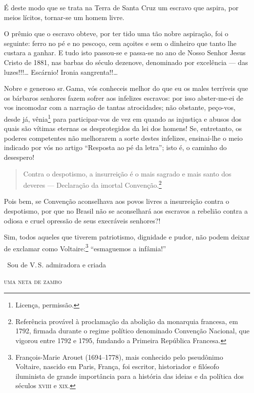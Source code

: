 É deste modo que se trata na Terra de Santa Cruz um escravo que aspira,
por meios lícitos, tornar-se um homem livre.

O prêmio que o escravo obteve, por ter tido uma tão nobre aspiração, foi
o seguinte: ferro no pé e no pescoço, cem açoites e sem o dinheiro que
tanto lhe custara a ganhar. E tudo isto passou-se e passa-se no ano de
Nosso Senhor Jesus Cristo de 1881, nas barbas do século dezenove,
denominado por excelência --- das luzes!!!\ldots{} Escárnio! Ironia
sangrenta!!\ldots{}

Nobre e generoso sr.\,Gama, vós conheceis melhor do que eu os males
terríveis que os bárbaros senhores fazem sofrer aos infelizes escravos:
por isso abster-me-ei de vos incomodar com a narração de tantas
atrocidades; não obstante, peço-vos, desde já, vênia\footnote{Licença,
  permissão.} para participar-vos de vez em quando as injustiça e abusos
dos quais são vítimas eternas os desprotegidos da lei dos homens! Se,
entretanto, os poderes competentes não melhorarem a sorte destes
infelizes, ensinai-lhe o meio indicado por vós no artigo ``Resposta
ao pé da letra''; isto é, o caminho do desespero!

\begin{quote}
Contra o despotismo, a insurreição é o mais sagrado e mais santo dos
deveres --- Declaração da imortal Convenção.\footnote{Referência
  provável à proclamação da abolição da monarquia francesa, em 1792,
  firmada durante o regime político denominado Convenção Nacional, que
  vigorou entre 1792 e 1795, fundando a Primeira República Francesa.}
\end{quote}

Pois bem, se Convenção aconselhava aos povos livres a insurreição contra
o despotismo, por que no Brasil não se aconselhará aos escravos a
rebelião contra a odiosa e cruel opressão de seus execráveis senhores?!

Sim, todos aqueles que tiverem patriotismo, dignidade e pudor, não podem
deixar de exclamar como Voltaire:\footnote{François-Marie Arouet
  (1694--1778), mais conhecido pelo pseudônimo Voltaire, nascido em
  Paris, França, foi escritor, historiador e filósofo iluminista de
  grande importância para a história das ideias e da política dos
  séculos \textsc{xviii} e \textsc{xix}.}
``esmaguemos a infâmia!''\medskip

\hfill\ Sou de V.\,S. admiradora e criada

\hfill\textsc{uma neta de zambo}

